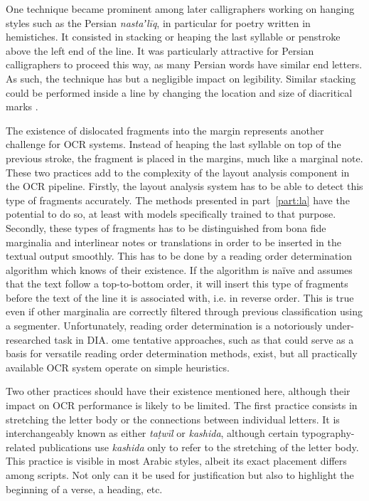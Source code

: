 One technique became prominent among later calligraphers working on hanging
styles such as the Persian \emph{nastaʼlīq}, in particular for poetry written
in hemi\-stiches. It consisted in stacking or heaping the last syllable or
penstroke above the left end of the line. It was particularly attractive for
Persian calligraphers to proceed this way, as many Persian words have similar
end letters. As such, the technique has but a negligible impact on legibility.
Similar stacking could be performed inside a line by changing the location and
size of diacritical marks \cite[pg. 14]{blair2006islamic}.

The existence of dislocated fragments into the margin represents another
challenge for OCR systems. Instead of heaping the last syllable on top of the
previous stroke, the fragment is placed in the margins, much like a marginal
note. These two practices add to the complexity of the layout analysis
component in the OCR pipeline. Firstly, the layout analysis system has to be
able to detect this type of fragments accurately. The methods presented in
part~\ref{part:la} have the potential to do so, at least with models specifically
trained to that purpose. Secondly, these types of fragments has to be
distinguished from bona fide marginalia and interlinear notes or translations
in order to be inserted in the textual output smoothly. This has to be done by
a reading order determination algorithm which knows of their existence. If the
algorithm is naïve and assumes that the text follow a top-to-bottom order, it
will insert this type of fragments before the text of the line it is associated
with, i.e. in reverse order. This is true even if other marginalia are correctly
filtered through previous classification using a segmenter. Unfortunately,
reading order determination is a notoriously under-researched task in DIA. ome
tentative approaches, such as \cite{dejean2019versatile} that could serve as a
basis for versatile reading order determination methods, exist, but all
practically available OCR system operate on simple heuristics.

Two other practices should have their existence mentioned here, although their
impact on OCR performance is likely to be limited. The first practice consists
in stretching the letter body or the connections between individual letters. It
is interchangeably known as either \emph{taṭwīl} or \emph{kashida}, although
certain typography-related publications use \emph{kashida} only to refer to the
stretching of the letter body. This practice is visible in most Arabic styles,
albeit its exact placement differs among scripts. Not only can it be used for
justification but also to highlight the beginning of a verse, a heading, etc. 

